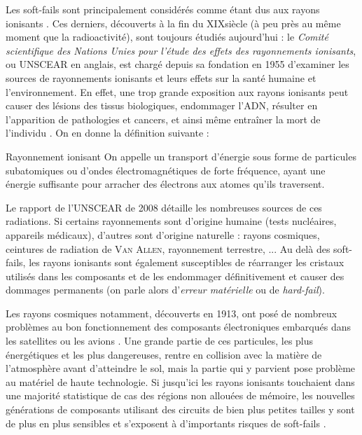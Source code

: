 \documentclass[a4paper,french,bookmarks]{article}
\begin{document}
    Les soft-fails sont principalement considérés comme étant dus aux rayons ionisants \cite{ziegler96,ziegler79}. Ces derniers, découverts à la fin du \textsc{XIX}\ieme siècle (à peu près au même moment que la radioactivité), sont toujours étudiés aujourd'hui : le \emph{Comité scientifique des Nations Unies pour l'étude des effets des rayonnements ionisants}, ou UNSCEAR en anglais, est chargé depuis sa fondation en 1955 d'examiner les sources de rayonnements ionisants et leurs effets sur la santé humaine et l'environnement. En effet, une trop grande exposition aux rayons ionisants peut causer des lésions des tissus biologiques, endommager l'ADN, résulter en l'apparition de pathologies et cancers, et ainsi même entraîner la mort de l'individu \cite{UNSCEAR08}. On en donne la définition suivante :
    
    \begin{definition}{Rayonnement ionisant}{}
        On appelle  un transport d'énergie sous forme de particules subatomiques ou d'ondes électromagnétiques de forte fréquence, ayant une énergie suffisante pour arracher des électrons aux atomes qu'ils traversent.
    \end{definition}
    
    Le rapport de l'UNSCEAR de 2008 \cite{UNSCEAR08} détaille les nombreuses sources de ces radiations. Si certains rayonnements sont d'origine humaine (tests nucléaires, appareils médicaux), d'autres sont d'origine naturelle \cite{nappa2021dejavu,UNSCEAR08,ziegler96,ziegler79,ziegler81}: rayons cosmiques, ceintures de radiation de \textsc{Van Allen}, rayonnement terrestre, ... Au delà des soft-fails, les rayons ionisants sont également susceptibles de réarranger les cristaux utilisés dans les composants et de les endommager définitivement et causer des dommages permanents (on parle alors d'\emph{erreur matérielle} ou de \emph{hard-fail}).

    Les rayons cosmiques notamment, découverts en 1913, ont posé de nombreux problèmes au bon fonctionnement des composants électroniques embarqués dans les satellites ou les avions \cite{ziegler96, nappa2021dejavu}. Une grande partie de ces particules, les plus énergétiques et les plus dangereuses, rentre en collision avec la matière de l'atmosphère avant d'atteindre le sol, mais la partie qui y parvient pose problème au matériel de haute technologie. Si jusqu'ici les rayons ionisants touchaient dans une majorité statistique de cas des régions non allouées de mémoire, les nouvelles générations de composants utilisant des circuits de bien plus petites tailles y sont de plus en plus sensibles et s'exposent à d'importants risques de soft-fails \cite{ziegler96, ziegler79, ziegler81}.
\end{document}
